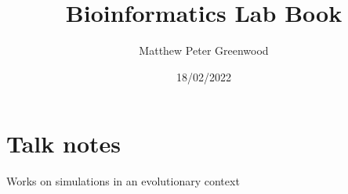 \documentclass[12pt]{report}
\author{Matthew Peter Greenwood}
\title{Bioinformatics Lab Book}
\date{18/02/2022}
\begin{document}
\section{Talk notes}

Works on simulations in an evolutionary context
\end{document}
